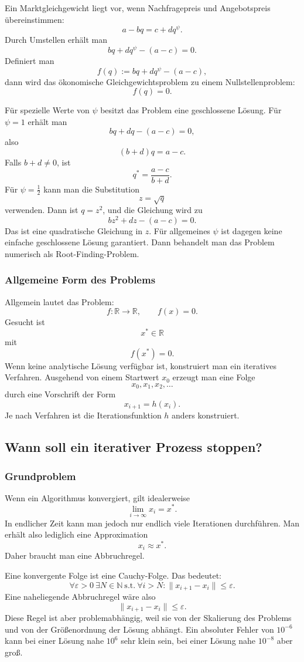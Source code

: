 \documentclass[10pt, letterpaper]{article}
\begin{document}
Ein Marktgleichgewicht liegt vor, wenn Nachfragepreis und Angebotspreis übereinstimmen:
\[
a-bq=c+dq^\psi.
\]
Durch Umstellen erhält man
\[
bq+dq^\psi-(a-c)=0.
\]
Definiert man
\[
f(q):=bq+dq^\psi-(a-c),
\]
dann wird das ökonomische Gleichgewichtsproblem zu einem Nullstellenproblem:
\[
f(q)=0.
\]

Für spezielle Werte von \(\psi\) besitzt das Problem eine geschlossene Lösung. Für \(\psi=1\) erhält man
\[
bq+dq-(a-c)=0,
\]
also
\[
(b+d)q=a-c.
\]
Falls \(b+d\neq 0\), ist
\[
q^\ast=\frac{a-c}{b+d}.
\]
Für \(\psi=\frac12\) kann man die Substitution
\[
z=\sqrt{q}
\]
verwenden. Dann ist \(q=z^2\), und die Gleichung wird zu
\[
bz^2+dz-(a-c)=0.
\]
Das ist eine quadratische Gleichung in \(z\). Für allgemeines \(\psi\) ist dagegen keine einfache geschlossene Lösung garantiert. Dann behandelt man das Problem numerisch als Root-Finding-Problem.

\subsubsection{Allgemeine Form des Problems}

Allgemein lautet das Problem:
\[
f:\mathbb{R}\to\mathbb{R},
\qquad
f(x)=0.
\]
Gesucht ist
\[
x^\ast\in\mathbb{R}
\]
mit
\[
f(x^\ast)=0.
\]
Wenn keine analytische Lösung verfügbar ist, konstruiert man ein iteratives Verfahren. Ausgehend von einem Startwert \(x_0\) erzeugt man eine Folge
\[
x_0,x_1,x_2,\dots
\]
durch eine Vorschrift der Form
\[
x_{i+1}=h(x_i).
\]
Je nach Verfahren ist die Iterationsfunktion \(h\) anders konstruiert.

\subsection{Wann soll ein iterativer Prozess stoppen?}

\subsubsection{Grundproblem}

Wenn ein Algorithmus konvergiert, gilt idealerweise
\[
\lim_{i\to\infty}x_i=x^\ast.
\]
In endlicher Zeit kann man jedoch nur endlich viele Iterationen durchführen. Man erhält also lediglich eine Approximation
\[
x_i\approx x^\ast.
\]
Daher braucht man eine Abbruchregel.

Eine konvergente Folge ist eine Cauchy-Folge. Das bedeutet:
\[
\forall \varepsilon>0\ \exists N\in\mathbb{N}\ \text{s.t.}\ \forall i>N:
\|x_{i+1}-x_i\|\leq \varepsilon.
\]
Eine naheliegende Abbruchregel wäre also
\[
\|x_{i+1}-x_i\|\leq \varepsilon.
\]
Diese Regel ist aber problemabhängig, weil sie von der Skalierung des Problems und von der Größenordnung der Lösung abhängt. Ein absoluter Fehler von \(10^{-6}\) kann bei einer Lösung nahe \(10^6\) sehr klein sein, bei einer Lösung nahe \(10^{-8}\) aber groß.
\end{document}
